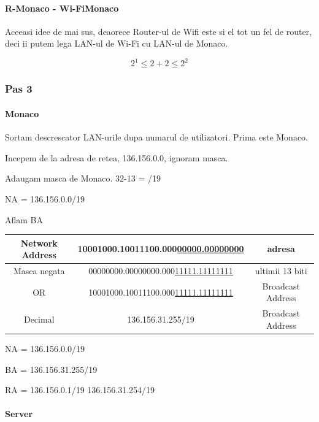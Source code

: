 \documentclass{article}
\begin{document}
\paragraph{R-Monaco - Wi-FiMonaco}

Aceeasi idee de mai sus, deaorece Router-ul de Wifi este si el tot un fel de router, deci ii putem lega LAN-ul de Wi-Fi cu LAN-ul de Monaco.



\[2^{1} \leq 2+2 \leq 2^{2}\]


\subsubsection{Pas 3}
\paragraph{Monaco}

Sortam descrescator LAN-urile dupa numarul de utilizatori. Prima este Monaco.

Incepem de la adresa de retea, 136.156.0.0, ignoram masca.

Adaugam masca de Monaco. 32-13 = /19

NA = 136.156.0.0/19

Aflam BA



\begin{center}
   \begin{tabular}{|c|c|c|}
   \hline

      Network Address &  10001000.10011100.000\underline{00000.00000000} & adresa  \\
    \hline
      Masca negata &  00000000.00000000.000\underline{11111.11111111} & ultimii 13 biti \\
    \hline \hline
       OR & 10001000.10011100.000\underline{11111.11111111} & Broadcast Address\\
    \hline
        Decimal & 136.156.31.255/19 &  Broadcast Address\\
    \hline
    \end{tabular}
\end{center}

NA = 136.156.0.0/19

BA = 136.156.31.255/19

RA = 136.156.0.1/19 136.156.31.254/19


\paragraph{Server}
\end{document}
